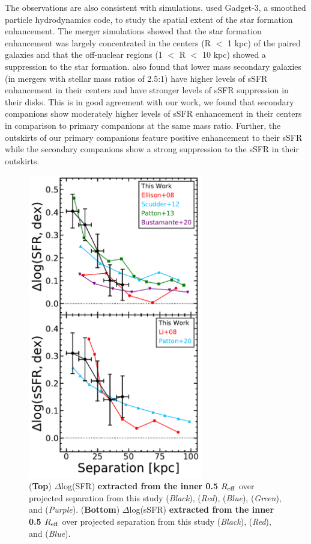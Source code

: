 \documentclass[iop,revtex4,twocolumn,apj,numberedappendix,appendixfloats]{emulateapj}
\newcommand{\reff}{$R_{\rm eff}$}
\begin{document}
The observations are also consistent with simulations. \citet{Moreno:2015} used {\sc Gadget}-3, a smoothed particle hydrodynamics code, to study the spatial extent of the star formation enhancement. The merger simulations showed that the star formation enhancement was largely concentrated in the centers (R $<$ 1 kpc) of the paired galaxies and that the off-nuclear regions (1 $<$ R $<$ 10 kpc) showed a suppression to the star formation. \citet{Moreno:2015} also found that lower mass secondary galaxies (in mergers with stellar mass ratios of 2.5:1) have higher levels of sSFR enhancement in their centers and have stronger levels of sSFR suppression in their disks. This is in good agreement with our work, we found that secondary companions show moderately higher levels of sSFR enhancement in their centers in comparison to primary companions at the same mass ratio. Further, the outskirts of our primary companions feature positive enhancement to their sSFR while the secondary companions show a strong suppression to the sSFR in their outskirts. 

\begin{figure}
\centering
\includegraphics[width=3in]{fig/nuc_sep.pdf}
\caption[]{(\textbf{Top}) $\Delta$log(SFR) \textbf{extracted from the inner 0.5 \reff} over projected separation from this study ({\it Black}), \citet{Ellison:2008} ({\it Red}), \citet{Scudder:2012} ({\it Blue}), \citet{Patton:2013} ({\it Green}), and \citet{Bustamante:2020} ({\it Purple}). (\textbf{Bottom}) $\Delta$log(sSFR) \textbf{extracted from the inner 0.5 \reff} over projected separation from this study ({\it Black}), \citet{Li:2008} ({\it Red}), and \citet{Patton:2020} ({\it Blue}).
}
\label{fig:nuc_sep}
\end{figure}
\end{document}

